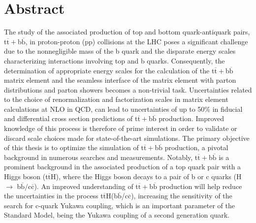 \newpage%
\clearpage%
\chapter*{Abstract}%
%
%
%

\noindent The study of the associated production of top and bottom quark-antiquark pairs, t$\overline{\text{t}}+$b$\overline{\text{b}}$, in proton-proton (pp) collisions at the LHC poses a significant challenge due to the nonnegligible mass of the b quark and the disparate energy scales characterizing interactions involving top and b quarks. %
Consequently, the determination of appropriate energy scales for the calculation of the t$\overline{\text{t}}+$b$\overline{\text{b}}$ matrix element and the seamless interface of the matrix element with parton distributions and parton showers becomes a non-trivial task. Uncertainties related to the choice of renormalization and factorization scales in matrix element calculations at NLO in QCD, can lead to uncertainties of up to 50\% in fiducial and differential cross section predictions of t$\overline{\text{t}}+$b$\overline{\text{b}}$ production. Improved knowledge of this process is therefore of prime interest in order to validate or discard scale choices made for state-of-the-art simulations. The primary objective of this thesis is to optimize the simulation of t$\overline{\text{t}}+$b$\overline{\text{b}}$ production, a pivotal background in numerous searches and measurements. Notably, t$\overline{\text{t}}+$b$\overline{\text{b}}$ is a prominent background in the associated production of a top quark pair with a Higgs boson (t$\overline{\text{t}}$H), where the Higgs boson decays to a pair of b or c quarks (H $\rightarrow$ b$\overline{\text{b}}/$c$\overline{\text{c}}$). An improved understanding of t$\overline{\text{t}}+$b$\overline{\text{b}}$ production will help reduce the uncertainties in the process t$\overline{\text{t}}$H(b$\overline{\text{b}}$/c$\overline{\text{c}}$), increasing the sensitivity of the search for c-quark Yukawa coupling, which is an important parameter of the Standard Model, being the Yukawa coupling of a second generation quark.






